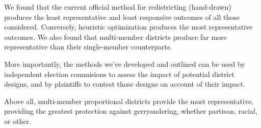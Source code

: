 \documentclass[preprint,12pt]{article}
\begin{document}
We found that the current official method for redistricting (hand-drawn) produces the least representative and least responsive outcomes of all those considered.  Conversely, heuristic optimization produces the most representative outcomes.  We also found that multi-member districts produce far more representative than their single-member counterparts.

More importantly, the methods we've developed and outlined can be used by independent election commisions to assess the impact of potential district designs, and by plaintiffs to contest those designs on account of their impact.

Above all, multi-member proportional districts provide the most representative, providing the greatest protection against gerryandering, whether partisan, racial, or other.

\clearpage
\end{document}
